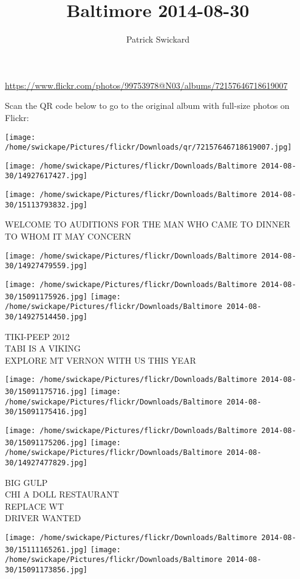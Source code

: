 \documentclass[10pt,letterpaper]{article}
\title{Baltimore 2014-08-30}
\author{Patrick Swickard}
\date{}
\begin{document}
\maketitle

\url{https://www.flickr.com/photos/99753978@N03/albums/72157646718619007}

Scan the QR code below to go to the original album with full-size photos on Flickr:

\texttt{[image: /home/swickape/Pictures/flickr/Downloads/qr/72157646718619007.jpg]}
\pagebreak

\texttt{[image: /home/swickape/Pictures/flickr/Downloads/Baltimore 2014-08-30/14927617427.jpg]}

\vspace{0.25in}
\texttt{[image: /home/swickape/Pictures/flickr/Downloads/Baltimore 2014-08-30/15113793832.jpg]}

WELCOME TO AUDITIONS FOR THE MAN WHO CAME TO DINNER\\
TO WHOM IT MAY CONCERN
\pagebreak

\texttt{[image: /home/swickape/Pictures/flickr/Downloads/Baltimore 2014-08-30/14927479559.jpg]}

\vspace{0.25in}
\texttt{[image: /home/swickape/Pictures/flickr/Downloads/Baltimore 2014-08-30/15091175926.jpg]}
\texttt{[image: /home/swickape/Pictures/flickr/Downloads/Baltimore 2014-08-30/14927514450.jpg]}

TIKI{-}PEEP 2012\\
TABI IS A VIKING\\
EXPLORE MT VERNON WITH US THIS YEAR
\pagebreak

\texttt{[image: /home/swickape/Pictures/flickr/Downloads/Baltimore 2014-08-30/15091175716.jpg]}
\texttt{[image: /home/swickape/Pictures/flickr/Downloads/Baltimore 2014-08-30/15091175416.jpg]}

\texttt{[image: /home/swickape/Pictures/flickr/Downloads/Baltimore 2014-08-30/15091175206.jpg]}
\texttt{[image: /home/swickape/Pictures/flickr/Downloads/Baltimore 2014-08-30/14927477829.jpg]}

BIG GULP\\
CHI A DOLL RESTAURANT\\
REPLACE WT\\
DRIVER WANTED
\pagebreak

\texttt{[image: /home/swickape/Pictures/flickr/Downloads/Baltimore 2014-08-30/15111165261.jpg]}
\texttt{[image: /home/swickape/Pictures/flickr/Downloads/Baltimore 2014-08-30/15091173856.jpg]}
\end{document}
